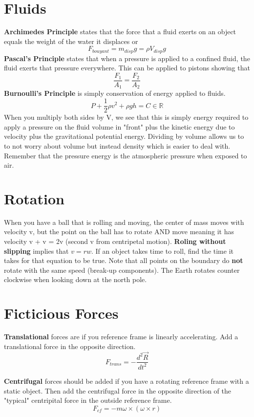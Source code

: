 \documentclass{article}
\begin{document}
\section{Fluids}
    \textbf{Archimedes Principle} states that the force that a fluid exerts on an object equals the weight
    of the water it displaces or
    $$F_{bouyant}=m_{disp}g=\rho V_{disp}g$$
    \textbf{Pascal's Principle} states that when a pressure is applied to a confined fluid, the fluid exerts
    that pressure everywhere. This can be applied to pistons showing that
    $$\frac{F_{1}}{A_{1}}=\frac{F_{2}}{A_{2}}$$
    \textbf{Burnoulli's Principle} is simply conservation of energy applied to fluids. 
    $$P+\frac{1}{2}\rho v^{2} + \rho gh = C\in \mathbb{R}$$
    When you multiply both sides by V, we see that this is simply energy required to apply a pressure on the 
    fluid volume in "front" plus the kinetic energy due to velocity plus the gravitational potential energy.
    Dividing by volume allows us to to not worry about volume but instead density which is easier to deal with.
    Remember that the pressure energy is the atmospheric pressure when exposed to air.

\section{Rotation}
    When you have a ball that is rolling and moving, the center of mass moves with velocity v, but the point 
    on the ball has to rotate AND move meaning it has velocity v + v = 2v (second v from centripetal motion).
    \textbf{Roling without slipping} implies that $v=rw$. If an object takes time to roll, find the time it takes
    for that equation to be true. Note that all points on the boundary do \textbf{not} rotate with the same speed (break-up components).
    The Earth rotates counter clockwise when looking down at the north pole.

\section{Ficticious Forces}
    \textbf{Translational} forces are if you reference frame is linearly accelerating. Add a translational force
    in the opposite direction.
    $$F_{trans}=-\frac{d^{2}\vec{R}}{dt^{2}}$$

    \textbf{Centrifugal} forces should be added if you have a rotating reference frame with a static object. Then 
    add the centrifugal force in the opposite direction of the "typical" centripital force in the outside reference
    frame. 
    $$F_{cf}=-m\omega\times(\omega\times r)$$
\end{document}
